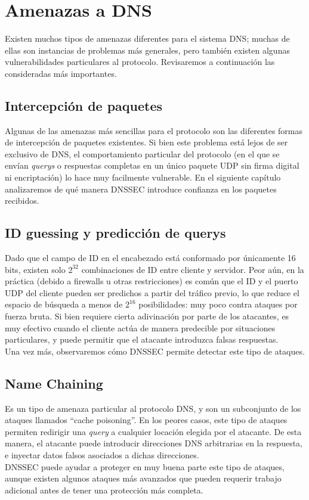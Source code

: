 \chapter{Amenazas a DNS}
Existen muchos tipos de amenazas diferentes para el sistema DNS; muchas de ellas son instancias de problemas m\'as generales, pero tambi\'en existen algunas vulnerabilidades particulares al protocolo. Revisaremos a continuaci\'on las consideradas m\'as importantes\cite{rfc3833}.
\section{Intercepci\'on de paquetes}
Algunas de las amenazas m\'as sencillas para el protocolo son las diferentes formas de intercepci\'on de paquetes existentes. Si bien este problema est\'a lejos de ser exclusivo de DNS, el comportamiento particular del protocolo (en el que se env\'ian \textit{querys} o respuestas completas en un \'unico paquete UDP sin firma digital ni encriptaci\'on) lo hace muy facilmente vulnerable. En el siguiente cap\'itulo analizaremos de qu\'e manera DNSSEC introduce confianza en los paquetes recibidos.
\section{ID guessing y predicci\'on de querys}
Dado que el campo de ID en el encabezado est\'a conformado por \'unicamente 16 bits, existen solo $2^{32}$ combinaciones de ID entre cliente y servidor. Peor a\'un, en la pr\'actica (debido a firewalls u otras restricciones) es com\'un que el ID y el puerto UDP del cliente pueden ser predichos a partir del tr\'afico previo, lo que reduce el espacio de b\'usqueda a menos de $2^{16}$ posibilidades: muy poco contra ataques por fuerza bruta. Si bien requiere cierta adivinaci\'on por parte de los atacantes, es muy efectivo cuando el cliente act\'ua de manera predecible por situaciones particulares, y puede permitir que el atacante introduzca falsas respuestas.\\
Una vez m\'as, observaremos c\'omo DNSSEC permite detectar este tipo de ataques.
\section{Name Chaining}
Es un tipo de amenaza particular al protocolo DNS, y son un subconjunto de los ataques llamados ``cache poisoning''. En los peores casos, este tipo de ataques permiten redirigir una \textit{query} a cualquier locaci\'on elegida por el atacante. De esta manera, el atacante puede introducir direcciones DNS arbitrarias en la respuesta, e inyectar datos falsos asociados a dichas direcciones.\\
DNSSEC puede ayudar a proteger en muy buena parte este tipo de ataques, aunque existen algunos ataques m\'as avanzados que pueden requerir trabajo adicional antes de tener una protecci\'on m\'as completa.
